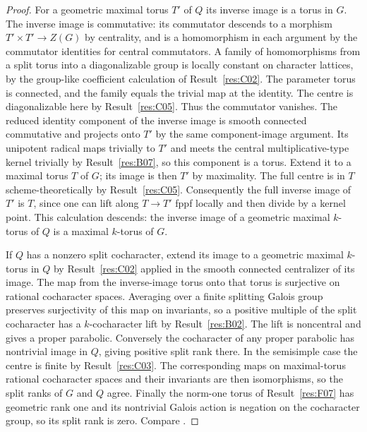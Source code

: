 \documentclass[11pt,a4paper,openany,oneside]{book}
\theoremstyle{resultstyle}
\theoremstyle{definition}
\numberwithin{equation}{chapter}
\begin{document}
\begin{proof}
For a geometric maximal torus \(T'\) of \(Q\) its
inverse image is a torus in \(G\).
The inverse image is commutative: its commutator
descends to a morphism \(T'\times T'\to Z(G)\) by centrality,
and is a homomorphism in each argument by the commutator
identities for central commutators. A family of homomorphisms
from a split torus into a diagonalizable group is locally
constant on character lattices, by the group-like coefficient
calculation of Result~\ref{res:C02}. The parameter torus is
connected, and the family equals the trivial map at the identity.
The centre is diagonalizable here by Result~\ref{res:C05}.
Thus the commutator vanishes. The reduced identity component
of the inverse image is smooth connected commutative and projects
onto \(T'\) by the same component-image argument.
Its unipotent radical maps trivially to \(T'\) and meets the
central multiplicative-type kernel trivially by
Result~\ref{res:B07}, so this component is a torus.
Extend it to a maximal torus \(T\) of \(G\); its image is
then \(T'\) by maximality. The full centre is in \(T\)
scheme-theoretically by Result~\ref{res:C05}. Consequently the
full inverse image of \(T'\) is \(T\), since one can lift
along \(T\to T'\) fppf locally and then divide by a kernel point.
This calculation descends: the inverse image of a geometric
maximal \(k\)-torus of \(Q\) is a maximal \(k\)-torus of \(G\).

If \(Q\) has a nonzero split cocharacter, extend its image
to a geometric maximal \(k\)-torus in \(Q\) by
Result~\ref{res:C02} applied in the smooth connected
centralizer of its image. The map from the inverse-image
torus onto that torus is surjective on rational cocharacter
spaces. Averaging over a finite splitting Galois group
preserves surjectivity of this map on invariants, so
a positive multiple of the split cocharacter has a
\(k\)-cocharacter lift by Result~\ref{res:B02}.
The lift is noncentral and gives a proper parabolic.
Conversely the cocharacter of any proper parabolic has
nontrivial image in \(Q\), giving positive split rank there.
In the semisimple case the centre is finite by
Result~\ref{res:C03}. The corresponding maps on maximal-torus
rational cocharacter spaces and their invariants are then
isomorphisms, so the split ranks of \(G\) and \(Q\) agree.
Finally the norm-one torus of Result~\ref{res:F07} has
geometric rank one and its nontrivial Galois action is
negation on the cocharacter group, so its split rank is
zero. Compare \cite[Sections 3.3 and 11.1]{conradfeng}.
\end{proof}
\end{document}
